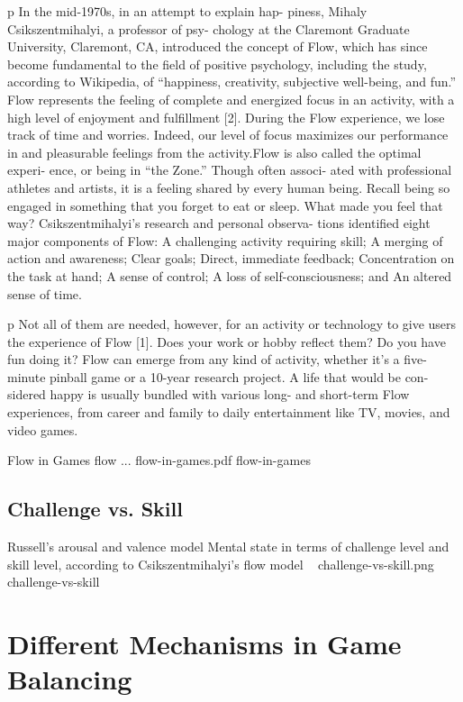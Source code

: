 \documentclass{uofsthesis-cs}
\begin{document}
p In the mid-1970s, in an attempt to explain hap- piness, Mihaly Csikszentmihalyi, a professor of psy- chology at the Claremont Graduate University, Claremont, CA, introduced the concept of Flow, which has since become fundamental to the field of positive psychology, including the study, according to Wikipedia, of “happiness, creativity, subjective well-being, and fun.” Flow represents the feeling of complete and energized focus in an activity, with a high level of enjoyment and fulfillment [2]. During the Flow experience, we lose track of time and worries. Indeed, our level of focus maximizes our performance in and pleasurable feelings from the activity.Flow is also called the optimal experi- ence, or being in “the Zone.” Though often associ- ated with professional athletes and artists, it is a feeling shared by every human being. Recall being so engaged in something that you forget to eat or sleep. What made you feel that way? Csikszentmihalyi’s research and personal observa- tions identified eight major components of Flow: 
 A challenging activity requiring skill;
 A merging of action and awareness;
 Clear goals;
 Direct, immediate feedback;
 Concentration on the task at hand; 
 A sense of control;
 A loss of self-consciousness; and
 An altered sense of time. 

p Not all of them are needed, however, for an activity or technology to give users the experience of Flow [1]. Does your work or hobby reflect them? Do you have fun doing it? Flow can emerge from any kind of activity, whether it’s a five-minute pinball game or a 10-year research project. A life that would be con- sidered happy is usually bundled with various long- and short-term Flow experiences, from career and family to daily entertainment like TV, movies, and video games. 

\img
{Flow in Games}
{flow ...}
{flow-in-games.pdf}
{flow-in-games}

\subsection{Challenge vs. Skill}

\img
{Russell's arousal and valence model}
{Mental state in terms of challenge level and skill level, according to Csikszentmihalyi's flow model ~\cite{csikszentmihalyi1997finding}}
{challenge-vs-skill.png}
{challenge-vs-skill}


\section{Different Mechanisms in Game Balancing}
\end{document}
